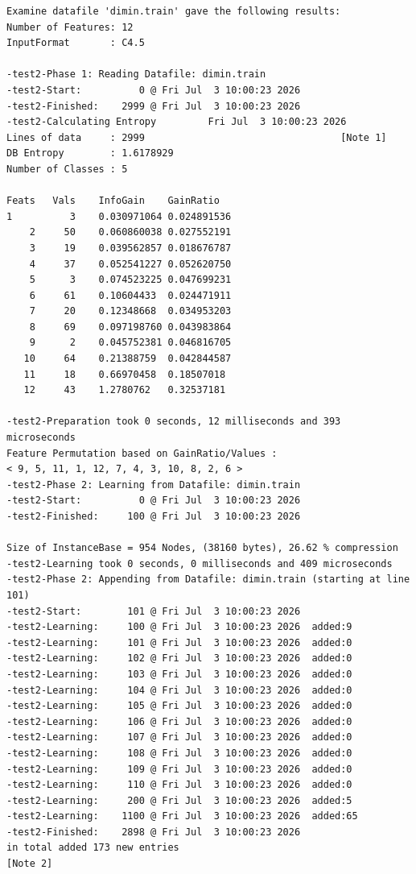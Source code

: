 \documentclass{report}
\begin{document}
\begin{footnotesize}
\begin{verbatim}
Examine datafile 'dimin.train' gave the following results:
Number of Features: 12
InputFormat       : C4.5

-test2-Phase 1: Reading Datafile: dimin.train
-test2-Start:          0 @ Fri Jul  3 10:00:23 2026
-test2-Finished:    2999 @ Fri Jul  3 10:00:23 2026
-test2-Calculating Entropy         Fri Jul  3 10:00:23 2026
Lines of data     : 2999                                  [Note 1]
DB Entropy        : 1.6178929
Number of Classes : 5

Feats	Vals	InfoGain	GainRatio
1          3	0.030971064	0.024891536
    2     50	0.060860038	0.027552191
    3     19	0.039562857	0.018676787
    4     37	0.052541227	0.052620750
    5      3	0.074523225	0.047699231
    6     61	0.10604433	0.024471911
    7     20	0.12348668	0.034953203
    8     69	0.097198760	0.043983864
    9      2	0.045752381	0.046816705
   10     64	0.21388759	0.042844587
   11     18	0.66970458	0.18507018
   12     43	1.2780762	0.32537181

-test2-Preparation took 0 seconds, 12 milliseconds and 393 microseconds
Feature Permutation based on GainRatio/Values :
< 9, 5, 11, 1, 12, 7, 4, 3, 10, 8, 2, 6 >
-test2-Phase 2: Learning from Datafile: dimin.train
-test2-Start:          0 @ Fri Jul  3 10:00:23 2026
-test2-Finished:     100 @ Fri Jul  3 10:00:23 2026

Size of InstanceBase = 954 Nodes, (38160 bytes), 26.62 % compression
-test2-Learning took 0 seconds, 0 milliseconds and 409 microseconds
-test2-Phase 2: Appending from Datafile: dimin.train (starting at line 101)
-test2-Start:        101 @ Fri Jul  3 10:00:23 2026
-test2-Learning:     100 @ Fri Jul  3 10:00:23 2026	 added:9
-test2-Learning:     101 @ Fri Jul  3 10:00:23 2026	 added:0
-test2-Learning:     102 @ Fri Jul  3 10:00:23 2026	 added:0
-test2-Learning:     103 @ Fri Jul  3 10:00:23 2026	 added:0
-test2-Learning:     104 @ Fri Jul  3 10:00:23 2026	 added:0
-test2-Learning:     105 @ Fri Jul  3 10:00:23 2026	 added:0
-test2-Learning:     106 @ Fri Jul  3 10:00:23 2026	 added:0
-test2-Learning:     107 @ Fri Jul  3 10:00:23 2026	 added:0
-test2-Learning:     108 @ Fri Jul  3 10:00:23 2026	 added:0
-test2-Learning:     109 @ Fri Jul  3 10:00:23 2026	 added:0
-test2-Learning:     110 @ Fri Jul  3 10:00:23 2026	 added:0
-test2-Learning:     200 @ Fri Jul  3 10:00:23 2026	 added:5
-test2-Learning:    1100 @ Fri Jul  3 10:00:23 2026	 added:65
-test2-Finished:    2898 @ Fri Jul  3 10:00:23 2026
in total added 173 new entries                                      [Note 2]


\end{verbatim}
\end{footnotesize}
\end{document}
